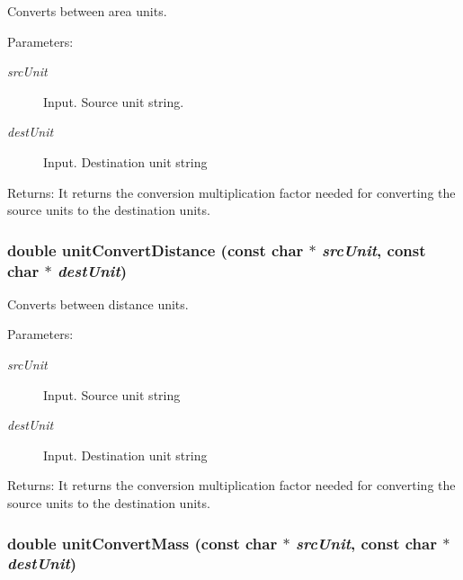 Converts between area units. 

\begin{Desc}
\item[Parameters:]
\begin{description}
\item[{\em srcUnit}]Input. Source unit string. \item[{\em destUnit}]Input. Destination unit string\end{description}
\end{Desc}
\begin{Desc}
\item[Returns:]It returns the conversion multiplication factor needed for converting the source units to the destination units. \end{Desc}
\hypertarget{group__unit__conv_g8fe6b1304fb3c8d0d21d62178367df0f}{
\subsubsection[unitConvertDistance]{\setlength{\rightskip}{0pt plus 5cm}double unitConvertDistance (const char $\ast$ {\em srcUnit}, \/  const char $\ast$ {\em destUnit})}}
\label{group__unit__conv_g8fe6b1304fb3c8d0d21d62178367df0f}


Converts between distance units. 

\begin{Desc}
\item[Parameters:]
\begin{description}
\item[{\em srcUnit}]Input. Source unit string \item[{\em destUnit}]Input. Destination unit string\end{description}
\end{Desc}
\begin{Desc}
\item[Returns:]It returns the conversion multiplication factor needed for converting the source units to the destination units. \end{Desc}
\hypertarget{group__unit__conv_g3fad4536c3e0108ca36dd54208bfa029}{
\subsubsection[unitConvertMass]{\setlength{\rightskip}{0pt plus 5cm}double unitConvertMass (const char $\ast$ {\em srcUnit}, \/  const char $\ast$ {\em destUnit})}}
\label{group__unit__conv_g3fad4536c3e0108ca36dd54208bfa029}


